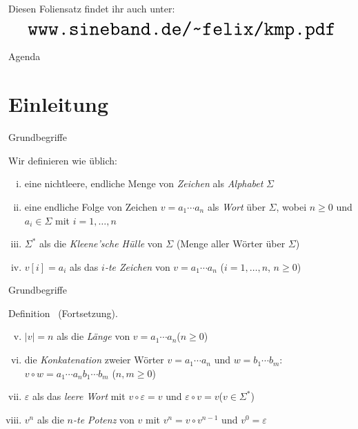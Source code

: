 \documentclass[xcolor=dvipsnames, aspectratio=169]{beamer}
\begin{document}
\frame[t,plain,label=titel]{
	\titlepage
}

\begin{frame}
Diesen Foliensatz findet ihr auch unter:
\[\text{\huge\texttt{www.sineband.de/\textasciitilde felix/kmp.pdf}}\]
\end{frame}

\begin{frame}{Agenda}
       \tableofcontents[ 
  		currentsubsection, 
  		hideothersubsections, 
   	 	sectionstyle=show, 
   	 ] 
\end{frame}

\section{Einleitung}

\printSectionYes

\begin{frame}[<+->]{Grundbegriffe}
\begin{defi}
Wir definieren wie üblich:
\begin{enumerate}[(i)]
\item eine nichtleere, endliche Menge von \textit{Zeichen} als \textit{Alphabet} $\Sigma$
\item eine endliche Folge von Zeichen $v=a_1\cdots a_n$ als \textit{Wort} über $\Sigma$, wobei $n\geq 0$ und $a_i\in\Sigma$ mit $i=1,\dots,n$
\item $\Sigma^*$ als die \textit{Kleene'sche Hülle} von $\Sigma$ (Menge aller Wörter über $\Sigma$)
\item $v[i]=a_i$ als das \textit{$i$-te Zeichen} von $v=a_1\cdots a_n$ \hfill($i=1,\dots,n$, $n\geq 0$)
\end{enumerate}
\end{defi}
\end{frame}

\begin{frame}[<+->]{Grundbegriffe}
\begin{mybox}{Definition \thedefinition\ (Fortsetzung).}
\begin{enumerate}[(i)]\setcounter{enumi}{4}
\item $\vert v\vert=n$ als die \textit{Länge} von $v=a_1\cdots a_n$\hfill($n\geq 0$)
\item die \textit{Konkatenation} zweier Wörter $v=a_1\cdots a_n$ und $w=b_1\cdots b_m$: $v\circ w=a_1\cdots a_nb_1\cdots b_m$ \hfill($n,m\geq 0$)
\item $\varepsilon$ als das \textit{leere Wort} mit $v\circ\varepsilon = v$ und $\varepsilon\circ v=v$\hfill($v\in\Sigma^*$)
\item $v^n$ als die \textit{$n$-te Potenz} von $v$ mit $v^n=v\circ v^{n-1}$ und $v^0 =\varepsilon$
\end{enumerate}
\end{mybox}
\end{frame}
\end{document}

